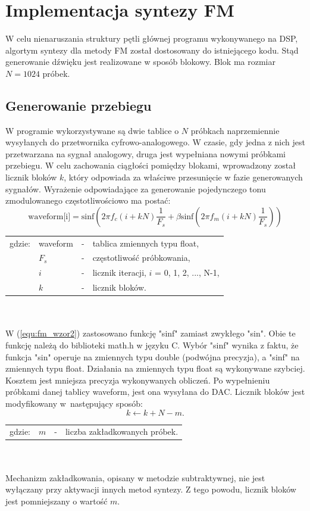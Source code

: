 \section{Implementacja syntezy FM}
W celu nienaruszania struktury pętli głównej programu wykonywanego na DSP, algortym syntezy dla metody FM został dostosowany do istniejącego kodu. Stąd generowanie dźwięku jest realizowane w sposób blokowy. Blok ma rozmiar $N = 1024$ próbek. 
\subsection{Generowanie przebiegu} \label{sec:fm_gen_przeb}
W programie wykorzystywane są dwie tablice o $N$ próbkach naprzemiennie wysyłanych do przetwornika cyfrowo-analogowego. W czasie, gdy jedna z nich jest przetwarzana na sygnał analogowy, druga jest wypełniana nowymi próbkami przebiegu. W celu zachowania ciągłości pomiędzy blokami, wprowadzony został licznik bloków $k$, który odpowiada za właściwe przesunięcie w fazie generowanych sygnałów. Wyrażenie odpowiadające za generowanie pojedynczego tonu zmodulowanego częstotliwościowo ma postać: 
\begin{equation} \label{equ:fm_wzor2}
\text{waveform[i]} = \text{sinf}(2\pi f_c(i+kN)\frac{1}{F_s} + \beta \text{sinf}(2 \pi f_m(i+kN)\frac{1}{F_s}))
\end{equation}
\begin{tabular}{ l l l l}
	gdzie: & waveform &  - & tablica zmiennych typu float, \\
	&	$F_s$ & - & częstotliwość próbkowania,\\
	&	$i$ & - &  licznik iteracji, $i$ = 0, 1, 2, ..., N-1,\\
	&	$k$ & - &  licznik bloków.\\
\end{tabular} \\ \\
W (\ref{equ:fm_wzor2}) zastosowano funkcję "sinf" zamiast zwykłego "sin". Obie te funkcję należą do biblioteki math.h w języku C. Wybór "sinf" wynika z faktu, że funkcja "sin" operuje na zmiennych typu double (podwójna precyzja), a "sinf" na zmiennych typu float. Działania na zmiennych typu float są wykonywane szybciej. Kosztem jest mniejsza precyzja wykonywanych obliczeń.
Po wypełnieniu próbkami danej tablicy waveform, jest ona wysyłana do DAC. Licznik bloków jest modyfikowany w~następujący sposób:
\begin{equation} \label{equ:fm_wzor3}
k \gets k + N - m.
\end{equation}
\begin{tabular}{ l l l l}
	gdzie: & $m$  &  - & liczba zakładkowanych próbek. \\
\end{tabular} \\ \\
Mechanizm zakładkowania, opisany w metodzie subtraktywnej, nie jest wyłączany przy aktywacji innych metod syntezy. Z tego powodu, licznik bloków jest pomniejszany o wartość $m$.
